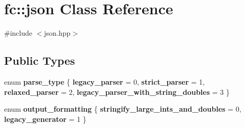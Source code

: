 \hypertarget{classfc_1_1json}{}\section{fc\+:\+:json Class Reference}
\label{classfc_1_1json}


{\ttfamily \#include $<$json.\+hpp$>$}

\subsection*{Public Types}
\begin{DoxyCompactItemize}
\item 
\mbox{\label{classfc_1_1json_a8554b1c7b658a170d4bc81d4bac798b1}} 
enum {\bfseries parse\+\_\+type} \{ {\bfseries legacy\+\_\+parser} = 0, 
{\bfseries strict\+\_\+parser} = 1, 
{\bfseries relaxed\+\_\+parser} = 2, 
{\bfseries legacy\+\_\+parser\+\_\+with\+\_\+string\+\_\+doubles} = 3
 \}
\item 
\mbox{\label{classfc_1_1json_afbd7971f1c3f78682333330895f02e5d}} 
enum {\bfseries output\+\_\+formatting} \{ {\bfseries stringify\+\_\+large\+\_\+ints\+\_\+and\+\_\+doubles} = 0, 
{\bfseries legacy\+\_\+generator} = 1
 \}
\end{DoxyCompactItemize}
